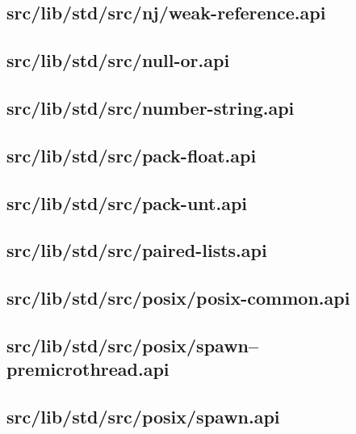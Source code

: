 \subsection{src/lib/std/src/nj/weak-reference.api}


\subsection{src/lib/std/src/null-or.api}


\subsection{src/lib/std/src/number-string.api}


\subsection{src/lib/std/src/pack-float.api}


\subsection{src/lib/std/src/pack-unt.api}


\subsection{src/lib/std/src/paired-lists.api}


\subsection{src/lib/std/src/posix/posix-common.api}


\subsection{src/lib/std/src/posix/spawn--premicrothread.api}


\subsection{src/lib/std/src/posix/spawn.api}


